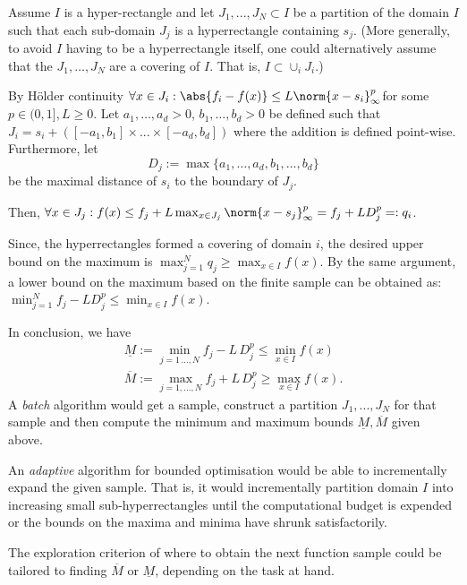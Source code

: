 Assume $I$ is a hyper-rectangle and  let  $J_1,...,J_N \subset I$ be a partition of the domain $I$ such that each sub-domain $J_j$ is a hyperrectangle containing $s_j$.
(More generally, to avoid $I$ having to be a hyperrectangle itself, one could alternatively assume that the $J_1,\ldots,J_N$ are a covering of $I$. That is, $I \subset \cup_i J_i$.)
 
By H\"older continuity $\forall x \in J_i: \abs{f_i - f(x)} \leq L \norm{x - s_i}_\infty^p$for some $p \in (0,1], L \geq 0$. 
Let  $a_1,\ldots,a_d >0$, $b_1,\ldots,b_d>0$ be defined such that $J_i =  s_i + ([-a_1,b_1] \times...\times [-a_d,b_d])$ where the addition is defined point-wise. Furthermore, let 
\begin{equation}
	D_j:= \max\{a_1,\ldots,a_d, b_1,\ldots,b_d\}
\end{equation}
 be the maximal distance of $s_i$ to the boundary of $J_j$.

Then, $\forall x \in J_j: f(x)  \leq f_j + L \max_{x \in J_j} \norm{x - s_j}_\infty^p =f_j + L D_j^p =: q_i$. 

Since, the hyperrectangles formed a covering of domain $i$, the desired upper bound on the maximum is $\max_{j=1}^N q_j \geq \max_{x \in I} f(x)$.
By the same argument, a lower bound on the maximum based on the finite sample can be obtained as:
$\min_{j=1}^N f_j - L D_j^p  \leq \min_{x \in I} f(x)$.

In conclusion, we have 
\begin{align}
\underline M := \min_{j=1\,...,N} f_j - L \, D_j^p  \leq \min_{x \in I} f(x) \label{eq:minhoeldineqfinsample}\\
\overline M := \max_{j=1,...,N} f_j + L \, D_j^p  \geq \max_{x \in I} f(x). \label{eq:maxhoeldineqfinsample}
\end{align}
%
A \textit{batch} algorithm would get a sample, construct a partition $J_1,...,J_N$ for that sample and then compute the minimum and maximum bounds $\underline M, \overline M$ given above.


An \textit{adaptive} algorithm for bounded optimisation would be able to incrementally expand the given sample. That is, it would incrementally partition domain $I$ into increasing small sub-hyperrectangles until the computational budget is expended or the bounds on the maxima and minima have shrunk satisfactorily. 

The exploration criterion of where to obtain the next function sample could be tailored to finding $\overline M$ or  $\underline M$, depending on the task at hand.


